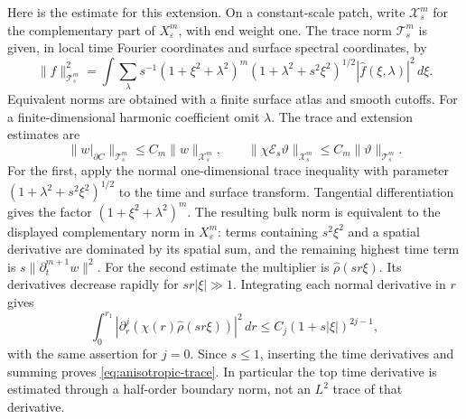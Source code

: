 \documentclass[11pt]{amsart}
\theoremstyle{definition}
\theoremstyle{remark}
\theoremstyle{plain}
\numberwithin{equation}{section}
\newcommand{\eps}{\varepsilon}
\begin{document}
Here is the estimate for this extension. On a constant-scale patch,
write $\mathcal X_s^m$ for the complementary part of $X^m_\eps$,
with end weight one. The trace norm $\mathcal T_s^m$ is given, in
local time Fourier coordinates and surface spectral coordinates, by
\[
\|f\|_{\mathcal T_s^m}^2=
\int\sum_\lambda s^{-1}(1+\xi^2+\lambda^2)^m
 (1+\lambda^2+s^2\xi^2)^{1/2}|\widehat f(\xi,\lambda)|^2\,d\xi.
\]
Equivalent norms are obtained with a finite surface atlas and smooth
cutoffs. For a finite-dimensional harmonic coefficient omit $\lambda$.
The trace and extension estimates are
\begin{equation}\label{eq:anisotropic-trace}
\|w|_{\partial C}\|_{\mathcal T_s^m}\le C_m\|w\|_{\mathcal X_s^m},
\qquad
\|\chi\mathcal E_s\vartheta\|_{\mathcal X_s^m}
 \le C_m\|\vartheta\|_{\mathcal T_s^m}.
\end{equation}
For the first, apply the normal one-dimensional trace inequality
with parameter $(1+\lambda^2+s^2\xi^2)^{1/2}$ to the time and
surface transform. Tangential differentiation gives the factor
$(1+\xi^2+\lambda^2)^m$. The resulting bulk norm is equivalent to
the displayed complementary norm in $X^m_\eps$: terms containing
$s^2\xi^2$ and a spatial derivative are dominated by its spatial
sum, and the remaining highest time term is
$s\|\partial_t^{m+1}w\|^2$. For the second estimate the multiplier
is $\widehat\rho(sr\xi)$. Its derivatives decrease rapidly for
$sr|\xi|\gg1$. Integrating each normal derivative in $r$ gives
\[
\int_0^{r_1}|\partial_r^j(\chi(r)\widehat\rho(sr\xi))|^2\,dr
 \le C_j(1+s|\xi|)^{2j-1},
\]
with the same assertion for $j=0$. Since $s\le1$, inserting the
time derivatives and summing proves \eqref{eq:anisotropic-trace}.
In particular the top time derivative is estimated through a
half-order boundary norm, not an $L^2$ trace of that derivative.
\end{document}
